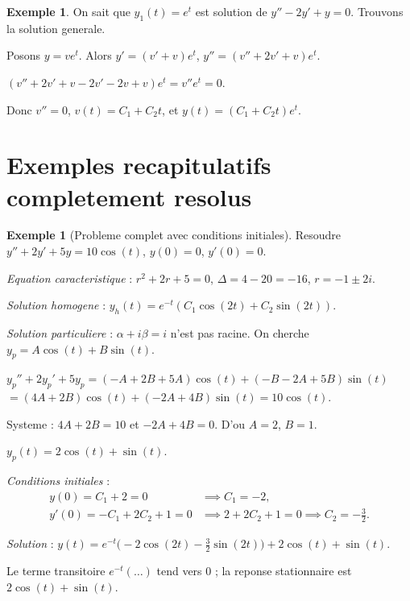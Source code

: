 \documentclass[12pt,a4paper,openany]{book}
\theoremstyle{definition}
\newtheorem{exemple}[definition]{Exemple}
\theoremstyle{plain}
\theoremstyle{remark}
\begin{document}
\begin{exemple}\label{ex:reduction-ordre}
On sait que $y_1(t) = e^t$ est solution de $y'' - 2y' + y = 0$. Trouvons la solution generale.

Posons $y = ve^t$. Alors $y' = (v' + v)e^t$, $y'' = (v'' + 2v' + v)e^t$.

$(v'' + 2v' + v - 2v' - 2v + v)e^t = v''e^t = 0$.

Donc $v'' = 0$, $v(t) = C_1 + C_2 t$, et $y(t) = (C_1 + C_2 t)e^t$.
\end{exemple}

\section{Exemples recapitulatifs completement resolus}\label{sec:exemples-recapitulatifs}

\begin{exemple}[Probleme complet avec conditions initiales]\label{ex:complet-1}
Resoudre $y'' + 2y' + 5y = 10\cos(t)$, $y(0) = 0$, $y'(0) = 0$.

\emph{Equation caracteristique} : $r^2 + 2r + 5 = 0$, $\Delta = 4 - 20 = -16$, $r = -1 \pm 2i$.

\emph{Solution homogene} : $y_h(t) = e^{-t}(C_1\cos(2t) + C_2\sin(2t))$.

\emph{Solution particuliere} : $\alpha + i\beta = i$ n'est pas racine. On cherche $y_p = A\cos(t) + B\sin(t)$.

$y_p'' + 2y_p' + 5y_p = (-A + 2B + 5A)\cos(t) + (-B - 2A + 5B)\sin(t)$
$= (4A + 2B)\cos(t) + (-2A + 4B)\sin(t) = 10\cos(t)$.

Systeme : $4A + 2B = 10$ et $-2A + 4B = 0$. D'ou $A = 2$, $B = 1$.

$y_p(t) = 2\cos(t) + \sin(t)$.

\emph{Conditions initiales} :
\begin{align*}
  y(0) = C_1 + 2 = 0 &\implies C_1 = -2, \\
  y'(0) = -C_1 + 2C_2 + 1 = 0 &\implies 2 + 2C_2 + 1 = 0 \implies C_2 = -\frac{3}{2}.
\end{align*}

\emph{Solution} : $y(t) = e^{-t}\bigl(-2\cos(2t) - \tfrac{3}{2}\sin(2t)\bigr) + 2\cos(t) + \sin(t)$.

Le terme transitoire $e^{-t}(\ldots)$ tend vers $0$ ; la reponse stationnaire est $2\cos(t) + \sin(t)$.
\end{exemple}
\end{document}
